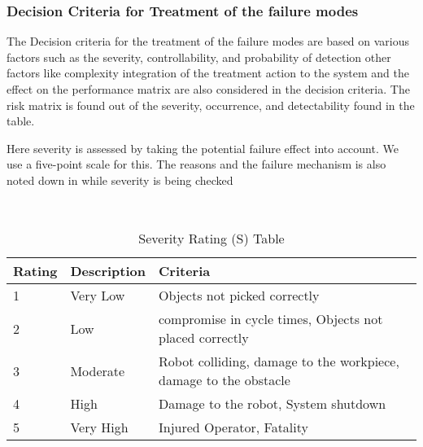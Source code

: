 {%






 
\subsubsection{\RaggedRight Decision Criteria for Treatment of the failure modes }

The Decision criteria for the treatment of the failure modes are based on various factors such as the severity, controllability, and probability of detection other factors like complexity integration of the treatment action to the system and the effect on the performance matrix are also considered in the decision criteria. The risk matrix is found  out of the severity, occurrence, and detectability found in the table.

Here severity is assessed by taking the potential failure effect into account. We use a five-point scale for this. The reasons and the failure mechanism is also noted down in while severity is being checked

\begin{table}[ht]
\centering\
\begin{tabularx}{\linewidth}{|X||X||X|}
\hline
 Rating & Description & Criteria \\
\hline
1 & Very Low &  Objects not picked correctly \\
\hline
2 & Low & compromise in cycle times, Objects not placed correctly \\
\hline
3 & Moderate & Robot colliding, damage to the workpiece, damage to the obstacle\\
 \hline
4 & High &  Damage to the robot, System shutdown\\
\hline
5 & Very High & Injured Operator, Fatality\\
\hline

 \end{tabularx}
  \caption{Severity Rating (S) Table}
\end{table}

}
